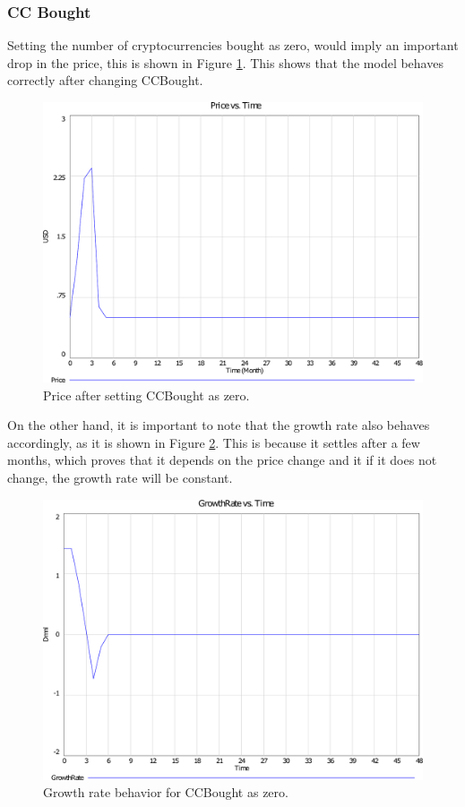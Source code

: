 	\subsubsection{CC Bought}
		Setting the number of cryptocurrencies bought as zero, would imply an important drop in the price, this is shown in Figure \ref{img:extrprice}. This shows that the model behaves correctly after changing CCBought. 
        \begin{figure}[H]
        	\centering
            \includegraphics[scale=0.3]{files/ExtrPrice.pdf}
            \caption{Price after setting CCBought as zero.}
            \label{img:extrprice}
        \end{figure}
        On the other hand, it is important to note that the growth rate also behaves accordingly, as it is shown in Figure \ref{img:extrgrowth}. This is because it settles after a few months, which proves that it depends on the price change and it if it does not change, the growth rate will be constant.
        
        \begin{figure}[H]
        	\centering
            \includegraphics[scale=0.3]{files/ExtrCCBoughtGrowth.pdf}
            \caption{Growth rate behavior for CCBought as zero.}
            \label{img:extrgrowth}
        \end{figure}
        

